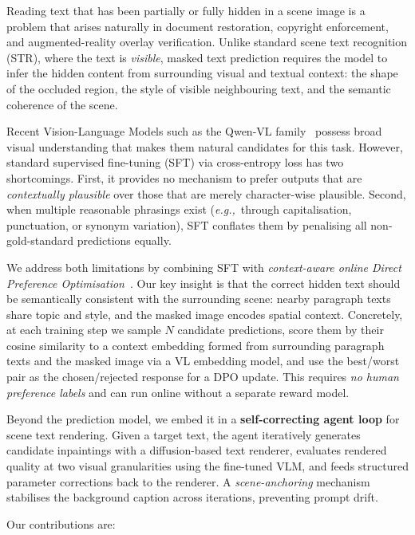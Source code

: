 \documentclass[uplatex,10pt,twocolumn,a4paper]{article}
\newcommand{\eg}{\textit{e.g.,}\ }
\begin{document}
Reading text that has been partially or fully hidden in a scene image
is a problem that arises naturally in document restoration, copyright
enforcement, and augmented-reality overlay verification.
Unlike standard scene text recognition (STR), where the text is
\emph{visible}, masked text prediction requires the model to infer the
hidden content from surrounding visual and textual context: the shape
of the occluded region, the style of visible neighbouring text, and the
semantic coherence of the scene.

Recent Vision-Language Models such as the Qwen-VL
family~\cite{qwen2vl2024} possess broad visual understanding that makes
them natural candidates for this task.
However, standard supervised fine-tuning (SFT) via cross-entropy loss
has two shortcomings.
First, it provides no mechanism to prefer outputs that are
\emph{contextually plausible} over those that are merely character-wise
plausible.
Second, when multiple reasonable phrasings exist (\eg through
capitalisation, punctuation, or synonym variation), SFT conflates them
by penalising all non-gold-standard predictions equally.

We address both limitations by combining SFT with \emph{context-aware
online Direct Preference Optimisation}~\cite{dpo2023}.
Our key insight is that the correct hidden text should be semantically
consistent with the surrounding scene: nearby paragraph texts share
topic and style, and the masked image encodes spatial context.
Concretely, at each training step we sample $N$ candidate predictions,
score them by their cosine similarity to a context embedding formed from
surrounding paragraph texts and the masked image via a VL embedding
model, and use the best/worst pair as the chosen/rejected response for
a DPO update.
This requires \emph{no human preference labels} and can run online
without a separate reward model.

Beyond the prediction model, we embed it in a \textbf{self-correcting
agent loop} for scene text rendering.
Given a target text, the agent iteratively generates candidate
inpaintings with a diffusion-based text renderer, evaluates rendered
quality at two visual granularities using the fine-tuned VLM, and feeds
structured parameter corrections back to the renderer.
A \emph{scene-anchoring} mechanism stabilises the background caption
across iterations, preventing prompt drift.

Our contributions are:
\end{document}
